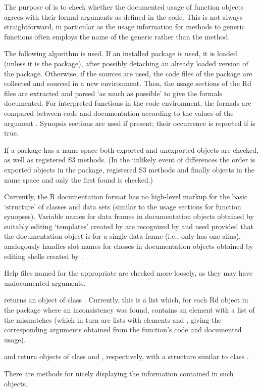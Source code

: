\begin{Details}\relax
The purpose of  is to check whether the documented usage
of function objects agrees with their formal arguments as defined in
the \R{} code.  This is not always straightforward, in particular as the
usage information for methods to generic functions often employs the
name of the generic rather than the method.

The following algorithm is used.  If an installed package is used, it
is loaded (unless it is the  package), after possibly
detaching an already loaded version of the package.  Otherwise, if the
sources are used, the \R{} code files of the package are collected and
sourced in a new environment.  Then, the usage sections of the Rd
files are extracted and parsed `as much as possible' to give
the formals documented.  For interpreted functions in the code
environment, the formals are compared between code and documentation
according to the values of the argument .  Synopsis
sections are used if present; their occurrence is reported if
 is true.

If a package has a name space both exported and unexported objects are
checked, as well as registered S3 methods.  (In the unlikely event of
differences the order is exported objects in the package, registered
S3 methods and finally objects in the name space and only the first
found is checked.)

Currently, the R documentation format has no high-level markup for the
basic `structure' of classes and data sets (similar to the usage
sections for function synopses).  Variable names for data frames in
documentation objects obtained by suitably editing `templates'
created by  are recognized by 
and used provided that the documentation object is for a single data
frame (i.e., only has one alias).   analogously
handles slot names for classes in documentation objects obtained by
editing shells created by .

Help files named  for the
appropriate  are checked more loosely, as they may
have undocumented arguments.
\end{Details}
%
\begin{Value}
 returns an object of class .  Currently,
this is a list which, for each Rd object in the package where an
inconsistency was found, contains an element with a list of the
mismatches (which in turn are lists with elements  and
, giving the corresponding arguments obtained from the
function's code and documented usage).

 and  return objects of class
 and , respectively, with a
structure similar to class .

There are  methods for nicely displaying the information
contained in such objects.
\end{Value}
